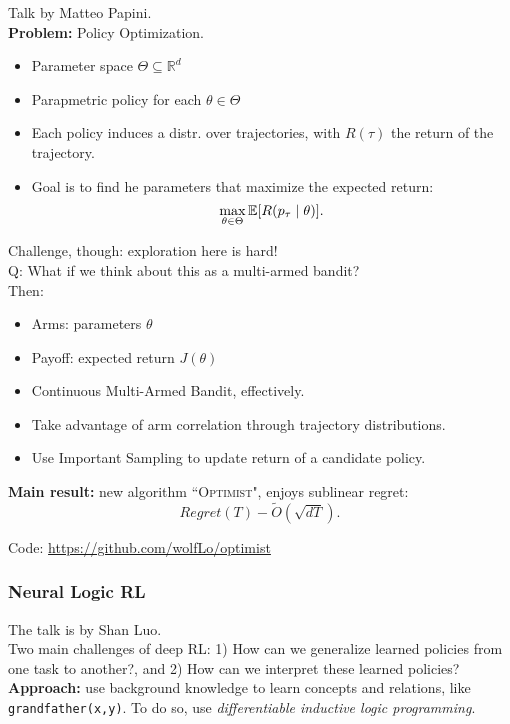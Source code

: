 Talk by Matteo Papini. \\

{\bf Problem:} Policy Optimization.
\begin{itemize}
    \item Parameter space $\Theta \subseteq \mathbb{R}^d$
    \item Parapmetric policy for each $\theta \in \Theta$
    \item Each policy induces a distr. over trajectories, with $R(\tau)$ the return of the trajectory.
    \item Goal is to find he parameters that maximize the expected return:
    \[
    \max_{\theta \in \Theta} \mathbb{E}[R(p_\tau \mid \theta)].
    \]
\end{itemize}

Challenge, though: exploration here is hard! \\

Q: What if we think about this as a multi-armed bandit? \\
Then:
\begin{itemize}
    \item Arms: parameters $\theta$
    \item Payoff: expected return $J(\theta)$
    \item Continuous Multi-Armed Bandit, effectively.
    \item Take advantage of arm correlation through trajectory distributions.
    \item Use Important Sampling to update return of a candidate policy.
\end{itemize}

{\bf Main result:} new algorithm ``\textsc{Optimist}", enjoys sublinear regret:
\[
Regret(T) - \tilde{O}(\sqrt{dT}).
\]

Code: \url{https://github.com/wolfLo/optimist} 

\spacerule

\subsubsection{Neural Logic RL~\cite{jiang2019neural}}

The talk is by Shan Luo. \\

Two main challenges of deep RL: 1) How can we generalize learned policies from one task to another?, and 2) How can we interpret these learned policies? \\

{\bf Approach:} use background knowledge to learn concepts and relations, like \texttt{grandfather(x,y)}. To do so, use {\it differentiable inductive logic programming}.

